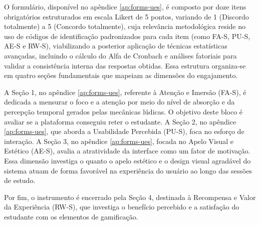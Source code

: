O formulário, disponível no apêndice \ref{ap:forms-ues}, é composto por doze itens obrigatórios estruturados em escala
Likert de 5 pontos, variando de 1 (Discordo totalmente) a 5 (Concordo
totalmente), cuja relevância metodológica reside no uso de códigos de
identificação padronizados para cada item (como FA-S, PU-S, AE-S e RW-S),
viabilizando a posterior aplicação de técnicas estatísticas avançadas, incluindo
o cálculo do Alfa de Cronbach e análises fatoriais para validar a consistência
interna das respostas obtidas. Essa estrutura organiza-se em quatro seções
fundamentais que mapeiam as dimensões do engajamento.

A Seção 1, no apêndice \ref{ap:forms-ues}, referente à Atenção e Imersão (FA-S), é dedicada a mensurar o foco e a
atenção por meio do nível de absorção e da percepção temporal gerados pelas
mecânicas lúdicas. O objetivo deste bloco é avaliar se a plataforma conseguiu
reter o estudante. A Seção 2, no apêndice \ref{ap:forms-ues}, que aborda a Usabilidade Percebida (PU-S), foca no
esforço de interação. A Seção 3, no apêndice \ref{ap:forms-ues}, focada no Apelo Visual e Estético (AE-S),
avalia a atratividade da interface como um fator de motivação. Essa dimensão
investiga o quanto o apelo estético e o design visual agradável do sistema atuam
de forma favorável na experiência do usuário ao longo das sessões de estudo.

Por fim, o instrumento é encerrado pela Seção 4, destinada à Recompensa e Valor
da Experiência (RW-S), que investiga o benefício percebido e a satisfação do
estudante com os elementos de gamificação.

%